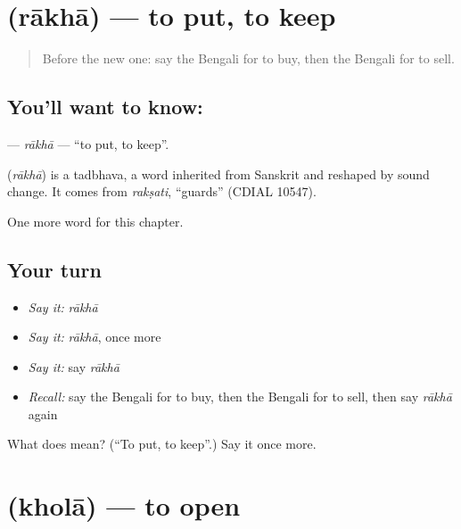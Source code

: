 \section[\texorpdfstring{\bn{রাখা} (rākhā)}{রাখা (rākhā)}]{ (rākhā) — to put, to keep}

\label{lesson:BN-C49-rakha}



\begin{quote}
Before the new one: say the Bengali for to buy, then the Bengali for to sell.
\end{quote}

\subsection*{You'll want to know: }
\textbf{} — \emph{rākhā} — \textquotedblleft{}to put, to keep\textquotedblright{}.

\begin{cousinweb}
\textbf{} (\emph{rākhā}) is a tadbhava, a word inherited from Sanskrit and reshaped by sound change. It comes from \emph{rakṣati}, \textquotedblleft{}guards\textquotedblright{} (CDIAL 10547).
\end{cousinweb}

\begin{grammarlens}[title={What you've built}]
One more word for this chapter.
\end{grammarlens}

\subsection*{Your turn}
\begin{itemize}
\raggedright
  \item \emph{Say it:} \emph{rākhā}
  \item \emph{Say it:} \emph{rākhā}, once more
  \item \emph{Say it:} say \emph{rākhā}
  \item \emph{Recall:} say the Bengali for to buy, then the Bengali for to sell, then say \emph{rākhā} again
\end{itemize}

\begin{tcolorbox}[breakable,colback=teal!4,colframe=teal!35!black,title={Before you move on}]
What does  mean? (\textquotedblleft{}To put, to keep\textquotedblright{}.) Say it once more.
\end{tcolorbox}
\section[\texorpdfstring{\bn{খোলা} (kholā)}{খোলা (kholā)}]{ (kholā) — to open}

